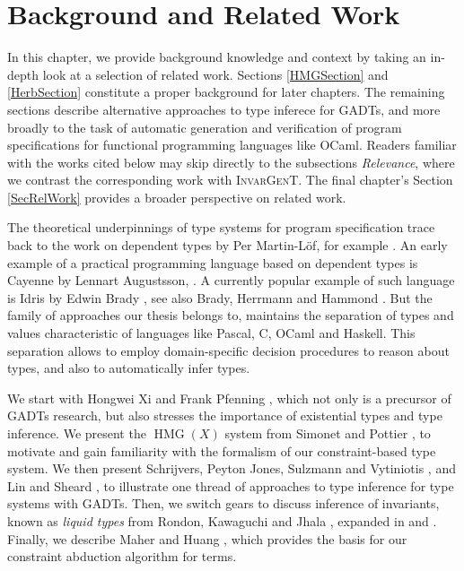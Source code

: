 \documentclass{article}
\newcommand{\tmem}[1]{{\em #1\/}}
\newcommand{\tmname}[1]{\textsc{#1}}
\newcommand{\tmop}[1]{\ensuremath{\operatorname{#1}}}
\begin{document}
\chapter{Background and Related Work}\label{ChapBackground}

In this chapter, we provide background knowledge and context by taking an
in-depth look at a selection of related work. Sections \ref{HMGSection} and
\ref{HerbSection} constitute a proper background for later chapters. The
remaining sections describe alternative approaches to type inferece for GADTs,
and more broadly to the task of automatic generation and verification of
program specifications for functional programming languages like OCaml.
Readers familiar with the works cited below may skip directly to the
subsections {\tmem{Relevance}}, where we contrast the corresponding work with
{\tmname{InvarGenT}}. The final chapter's Section \ref{SecRelWork} provides a
broader perspective on related work.

The theoretical underpinnings of type systems for program specification trace
back to the work on dependent types by Per Martin-L{\"o}f, for example
{\cite{MartinLof}}. An early example of a practical programming language based
on dependent types is Cayenne by Lennart Augustsson, {\cite{Cayenne}}. A
currently popular example of such language is Idris by Edwin Brady
{\cite{IdrisCurrent}}, see also Brady, Herrmann and Hammond
{\cite{IdrisEarly}}. But the family of approaches our thesis belongs to,
maintains the separation of types and values characteristic of languages like
Pascal, C, OCaml and Haskell. This separation allows to employ domain-specific
decision procedures to reason about types, and also to automatically infer
types.

We start with Hongwei Xi and Frank Pfenning {\cite{DML99}}, which not only is
a precursor of GADTs research, but also stresses the importance of existential
types and type inference. We present the $\tmop{HMG} (X)$ system from Simonet
and Pottier {\cite{simonet-pottier-hmg-toplas}}, to motivate and gain
familiarity with the formalism of our constraint-based type system. We then
present Schrijvers, Peyton Jones, Sulzmann and Vytiniotis {\cite{OutsideIn}},
and Lin and Sheard {\cite{PointwiseGADTs}}, to illustrate one thread of
approaches to type inference for type systems with GADTs. Then, we switch
gears to discuss inference of invariants, known as {\tmem{liquid types}} from
Rondon, Kawaguchi and Jhala {\cite{DSolvePaper}}, expanded in
{\cite{DSolveTechRep}} and {\cite{DSolveThesis}}. Finally, we describe Maher
and Huang {\cite{AbductionSolvMaher}}, which provides the basis for our
constraint abduction algorithm for terms.
\end{document}

